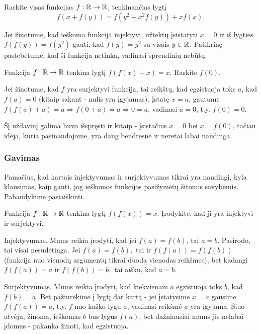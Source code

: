\begin{pav}
Raskite visas funkcijas $f:\mathbb R \to \mathbb R$, tenkinančias lygtį $$f(x+f(y)) =
f(y^2 + x^2f(y)) + xf(x).$$
\end{pav}

Jei žinotume, kad ieškoma funkcija injektyvi, užtektų įsistatyti $x = 0$ ir
iš lygties $f(f(y))=f(y^2)$ gauti, kad $f(y)=y^2$ su visais $y \in \mathbb R$.
Patikrinę pastebėtume, kad ši funkcija netinka, vadinasi sprendinių nebūtų.

\begin{pav}
Funkcija $f:\mathbb R \to \mathbb R$ tenkina lygtį $f(f(x)+x) = x$. Raskite $f(0)$.
\end{pav}

Jei žinotume, kad $f$ yra surjektyvi funkcija, tai reikštų, kad egzistuoja
toks $a$, kad $f(a)=0$ (kitaip sakant - nulis yra įgyjamas). Įstatę $x
= a$, gautume $f(f(a)+a)= a \Rightarrow f(0+a)=a \Rightarrow 0 =a$,
vadinasi $a = 0$, t.y. $f(0)=0$.

Šį uždavinį galima buvo išspręsti ir kitaip - įsistačius $x=0$ bei
$x=f(0)$, tačiau idėja, kuria pasinaudojome, yra daug bendresnė ir neretai
labai naudinga.

\subsubsection{Gavimas}
\bigskip

Pamačius, kad kartais injektyvumas ir surjektyvumas tikrai yra naudingi,
kyla klausimas, kaip gauti, jog ieškomos funkcijos pasižymėtų šitomis
savybėmis. Pabandykime pasiaiškinti.

\begin{pav}
Funkcija $f:\mathbb R \to \mathbb R$ tenkina lygtį $f(f(x)) = x$. Įrodykite, kad ji yra
injektyvi ir surjektyvi.
\end{pav}

Injektyvumas. Mums reikia įrodyti, kad jei $f(a)=f(b)$, tai $a=b$. Pasirodo,
tai visai nesudėtinga. Jei $f(a)=f(b),$ tai ir $f(f(a))=f(f(b))$ (funkcija
nuo vienodų argumentų tikrai duoda vienodas reikšmes), bet kadangi
$f(f(a))=a$ ir $f(f(b))=b,$ tai aišku, kad $a=b.$


Surjektyvumas. Mums reikia įrodyti, kad kiekvienam $a$ egzistuoja toks $b$,
kad $f(b)=a$. Bet pažiūrėkime į lygtį dar kartą - jei įstatysime $x=a$
gausime $f(f(a))=a$, t.y. $f$ nuo kažko lygu $a$, vadinasi reikšmė $a$ yra
įgyjama. Šiuo atvėju, žinoma, ieškomas $b$ bus lygus $f(a)$, bet
dažniausiai mums jis nelabai įdomus - pakanka žinoti, kad egzistuoja.

